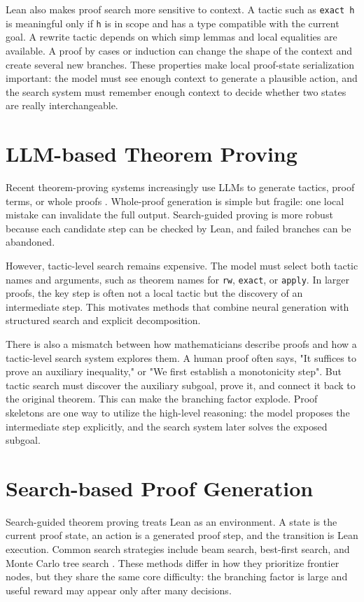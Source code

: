 Lean also makes proof search more sensitive to context. A tactic such as \texttt{exact h} is meaningful
only if \texttt{h} is in scope and has a type compatible with the current goal. A rewrite tactic depends on
which simp lemmas and local equalities are available. A proof by cases or induction can change the shape
of the context and create several new branches. These properties make local proof-state serialization
important: the model must see enough context to generate a plausible action, and the search system must
remember enough context to decide whether two states are really interchangeable.

\section{LLM-based Theorem Proving}

Recent theorem-proving systems increasingly use LLMs to generate tactics, proof terms, or whole proofs \citep{yang2023leandojo}. Whole-proof generation is simple but fragile: one local mistake can invalidate the full output. Search-guided proving is more robust because each candidate step can be checked by Lean, and failed branches can be abandoned.

However, tactic-level search remains expensive. The model must select both tactic names and arguments, such as theorem names for \texttt{rw}, \texttt{exact}, or \texttt{apply}. In larger proofs, the key step is often not a local tactic but the discovery of an intermediate step. This motivates methods that combine neural generation with structured search and explicit decomposition.

There is also a mismatch between how mathematicians describe proofs and how a tactic-level search
system explores them. A human proof often says, "It suffices to prove an auxiliary inequality," or "We
first establish a monotonicity step". But tactic search must discover the auxiliary subgoal, prove it, and connect it back to the original theorem.
This can make the branching factor explode. Proof
skeletons are one way to utilize the high-level reasoning: the model proposes the intermediate
step explicitly, and the search system later solves the exposed subgoal.

\section{Search-based Proof Generation}

Search-guided theorem proving treats Lean as an environment. A state is the current proof state, an action is a generated proof step, and the transition is Lean execution. Common search strategies include beam search, best-first search, and Monte Carlo tree search \citep{polu2020gptf,lample2022hypertree,yang2023leandojo}. These methods differ in how they prioritize frontier nodes, but they share the same core difficulty: the branching factor is large and useful reward may appear only after many decisions.

